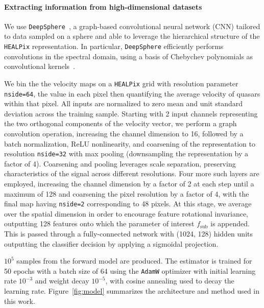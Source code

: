 \documentclass[]{article}
\begin{document}
\paragraph{Extracting information from high-dimensional datasets} We use \texttt{DeepSphere}~\cite{2020arXiv201215000D,Perraudin:2018rbt}, a graph-based convolutional neural network (CNN) tailored to data sampled on a sphere and able to leverage the hierarchical structure of the \texttt{HEALPix} representation. In particular, \texttt{DeepSphere} efficiently performs convolutions in the spectral domain, using a basis of Chebychev polynomials as convolutional kernels~\cite{2016arXiv160609375D}. 

We bin the the velocity maps on a \texttt{HEALPix} grid with resolution parameter \texttt{nside=64}, the value in each pixel then quantifying the average velocity of quasars within that pixel. All inputs are normalized to zero mean and unit standard deviation across the training sample. Starting with 2 input channels representing the two orthogonal components of the velocity vector, we perform a graph convolution operation, increasing the channel dimension to 16, followed by a batch normalization, ReLU nonlinearity, and coarsening of the representation to resolution \texttt{nside=32} with max pooling (downsampling the representation by a factor of 4). Coarsening and pooling leverages scale separation, preserving characteristics of the signal across different resolutions. Four more such layers are employed, increasing the channel dimension by a factor of 2 at each step until a maximum of 128 and coarsening the pixel resolution by a factor of 4, with the final map having \texttt{nside=2} corresponding to 48 pixels. At this stage, we average over the spatial dimension in order to encourage feature rotational invariance, outputting 128 features onto which the parameter of interest $f_\mathrm{sub}$ is appended. This is passed through a fully-connected network with (1024, 128) hidden units outputting the classifier decision by applying a sigmoidal projection.

$10^5$ samples from the forward model are produced. The estimator is trained for 50 epochs with a batch size of 64 using the \texttt{AdamW} optimizer with initial learning rate $10^{-3}$ and weight decay $10^{-5}$, with cosine annealing used to decay the learning rate. Figure~\ref{fig:model} summarizes the architecture and method used in this work.

\end{document}
